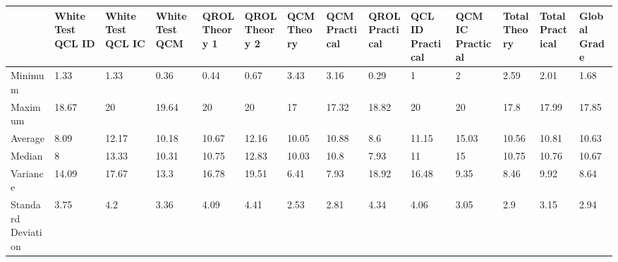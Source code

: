 \documentclass[a4paper,11pt]{report}
\numberwithin{figure}{section} %
\begin{document}
    \begin{center}
      \begin{tabular}{| p{1cm} | p{0.6cm} | p{0.6cm} | p{0.6cm} | p{0.6cm} | p{0.6cm} | p{0.6cm} | p{0.6cm} | p{0.6cm} | p{0.6cm} | p{0.6cm} | p{0.6cm} | p{0.6cm} | p{0.6cm} | }
      \hline
      & \tiny{White Test QCL ID} & \tiny{White Test QCL IC} & \tiny{White Test QCM} & \tiny{QROL Theory 1} & \tiny{QROL Theory 2} & \tiny{QCM Theory} & \tiny{QCM Practical} & \tiny{QROL Practical} & \tiny{QCL ID Practical} & \tiny{QCM IC Practical} & \tiny{Total Theory} & \tiny{Total Practical} & \tiny{Global Grade}\\ \hline
      \tiny{Minimum} & \tiny{1.33} & \tiny{1.33} & \tiny{0.36} & \tiny{0.44} & \tiny{0.67} & \tiny{3.43} & \tiny{3.16} & \tiny{0.29} & \tiny{1} & \tiny{2} & \tiny{2.59} & \tiny{2.01} & \tiny{1.68}\\ \hline
      \tiny{Maximum} & \tiny{18.67} & \tiny{20} & \tiny{19.64} & \tiny{20} & \tiny{20} & \tiny{17} & \tiny{17.32} & \tiny{18.82} & \tiny{20} & \tiny{20} & \tiny{17.8} & \tiny{17.99} & \tiny{17.85}\\ \hline
      \tiny{Average} & \tiny{8.09} & \tiny{12.17} & \tiny{10.18} & \tiny{10.67} & \tiny{12.16} & \tiny{10.05} & \tiny{10.88} & \tiny{8.6} & \tiny{11.15} & \tiny{15.03} & \tiny{10.56} & \tiny{10.81} & \tiny{10.63}\\ \hline
      \tiny{Median} & \tiny{8} & \tiny{13.33} & \tiny{10.31} & \tiny{10.75} & \tiny{12.83} & \tiny{10.03} & \tiny{10.8} & \tiny{7.93} & \tiny{11} & \tiny{15} & \tiny{10.75} & \tiny{10.76} & \tiny{10.67}\\ \hline
      \tiny{Variance} & \tiny{14.09} & \tiny{17.67} & \tiny{13.3} & \tiny{16.78} & \tiny{19.51} & \tiny{6.41} & \tiny{7.93} & \tiny{18.92} & \tiny{16.48} & \tiny{9.35} & \tiny{8.46} & \tiny{9.92} & \tiny{8.64}\\ \hline
      \tiny{Standard Deviation} & \tiny{3.75} & \tiny{4.2} & \tiny{3.36} & \tiny{4.09} & \tiny{4.41} & \tiny{2.53} & \tiny{2.81} & \tiny{4.34} & \tiny{4.06} & \tiny{3.05} & \tiny{2.9} & \tiny{3.15} & \tiny{2.94}\\ \hline
      \end{tabular}


    \end{center}
\end{document}
